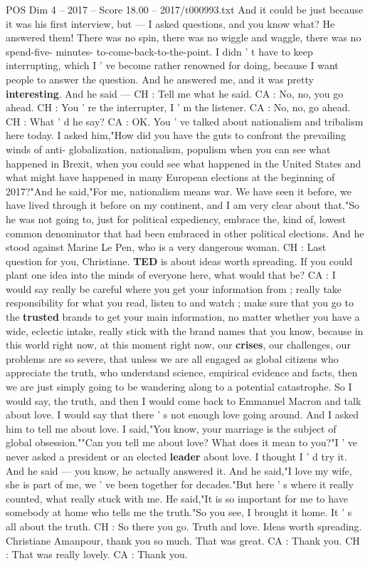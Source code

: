 \begin{textsample}{POS Dim 4 – 2017 – Score 18.00 – 2017/t000993.txt}
And it could be just because it was his first interview, but — I asked questions, and you know what?
He answered them!
There was no spin, there was no wiggle and waggle, there was no spend-five- minutes- to-come-back-to-the-point.
I didn ' t have to keep interrupting, which I ' ve become rather renowned for doing, because I want people to answer the question.
And he answered me, and it was pretty \textbf{interesting}.
And he said — CH : Tell me what he said.
CA : No, no, you go ahead.
CH : You ' re the interrupter, I ' m the listener.
CA : No, no, go ahead.
CH : What ' d he say?
CA : OK.
You ' ve talked about nationalism and tribalism here today.
I asked him,"How did you have the guts to confront the prevailing winds of anti- globalization, nationalism, populism when you can see what happened in Brexit, when you could see what happened in the United States and what might have happened in many European elections at the beginning of 2017?"And he said,"For me, nationalism means war.
We have seen it before, we have lived through it before on my continent, and I am very clear about that."So he was not going to, just for political expediency, embrace the, kind of, lowest common denominator that had been embraced in other political elections.
And he stood against Marine Le Pen, who is a very dangerous woman.
CH : Last question for you, Christiane. \textbf{TED} is about ideas worth spreading.
If you could plant one idea into the minds of everyone here, what would that be?
CA : I would say really be careful where you get your information from ; really take responsibility for what you read, listen to and watch ; make sure that you go to the \textbf{trusted} brands to get your main information, no matter whether you have a wide, eclectic intake, really stick with the brand names that you know, because in this world right now, at this moment right now, our \textbf{crises}, our challenges, our problems are so severe, that unless we are all engaged as global citizens who appreciate the truth, who understand science, empirical evidence and facts, then we are just simply going to be wandering along to a potential catastrophe.
So I would say, the truth, and then I would come back to Emmanuel Macron and talk about love.
I would say that there ' s not enough love going around.
And I asked him to tell me about love.
I said,"You know, your marriage is the subject of global obsession.""Can you tell me about love?
What does it mean to you?"I ' ve never asked a president or an elected \textbf{leader} about love.
I thought I ' d try it.
And he said — you know, he actually answered it.
And he said,"I love my wife, she is part of me, we ' ve been together for decades."But here ' s where it really counted, what really stuck with me.
He said,"It is so important for me to have somebody at home who tells me the truth."So you see, I brought it home.
It ' s all about the truth.
CH : So there you go.
Truth and love.
Ideas worth spreading.
Christiane Amanpour, thank you so much.
That was great.
CA : Thank you.
CH : That was really lovely.
CA : Thank you.

\end{textsample}
